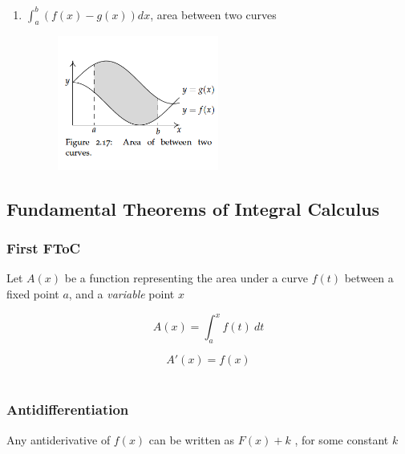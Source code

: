 \documentclass[english,course]{Notes}
\newcommand{\ita}[1]{\textit{#1}}
\begin{document}
\begin{enumerate}
	\item {$\int_a^b \left(f(x) - g(x)\right) dx$, area between two curves}
\begin{figure}[!h]
\centering
\includegraphics[width=0.5\textwidth]{intprop2Curves}
\end{figure}

\end{enumerate}
\newpage
\subsection{Fundamental Theorems of Integral Calculus}

\subsubsection{First FToC}
\par{Let $A(x)$ be a function representing the area under a curve $f(t)$ between a fixed point $a$, and a \ita{variable} point $x$}

$$ A(x) = \int_{a}^{x} f(t) \ dt$$

\begin{theorem} $$A' (x) = f(x)$$ ~\label{ftoc:1} \end{theorem}


\subsubsection{Antidifferentiation}


\begin{theorem}Any antiderivative of $f(x)$ can be written as $F(x) + k$ , for some constant $k$~\label{ftoc:anti}\end{theorem}
\end{document}
